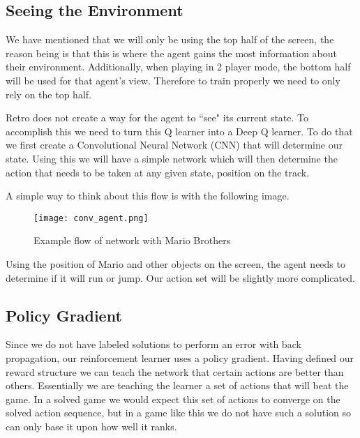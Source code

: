 \documentclass[12pt,letter]{article}
\begin{document}
\subsection{Seeing the Environment}
We have mentioned that we will only be using the top half of the screen, the
reason being is that this is where the agent gains the most information about
their environment. Additionally, when playing in 2 player mode, the bottom half
will be used for that agent's view. Therefore to train properly we need to only
rely on the top half. 

Retro does not create a way for the agent to ``see" its current state. To 
accomplish this we need to turn this Q learner into a Deep Q learner. To do that
we first create a Convolutional Neural Network (CNN) that will determine our
state. Using this we will have a simple network which will then determine the
action that needs to be taken at any given state, position on the track. 

A simple way to think about this flow is with the following image.
\begin{figure}[h]
    \centering
    \texttt{[image: conv\_agent.png]}
    \caption{Example flow of network with Mario Brothers}
\end{figure}
Using the position of Mario and other objects on the screen, the agent needs
to determine if it will run or jump. Our action set will be slightly more
complicated. 

\subsection{Policy Gradient}
Since we do not have labeled solutions to perform an error with back propagation,
our reinforcement learner uses a policy gradient. Having defined our reward 
structure we can teach the network that certain actions are better than others.
Essentially we are teaching the learner a set of actions that will beat the game.
In a solved game we would expect this set of actions to converge on the solved
action sequence, but in a game like this we do not have such a solution so can
only base it upon how well it ranks. 
\end{document}
